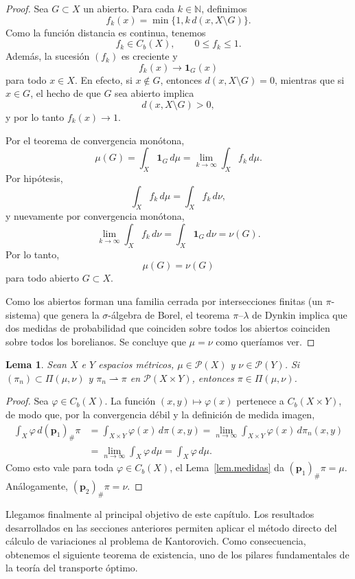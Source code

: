 \documentclass[12pt, a4paper]{amsbook}
\newcommand{\pp}{{\mathbf p}}
\newtheorem{lema}[teo]{Lema}
\theoremstyle{remark}
\theoremstyle{definition}
\numberwithin{section}{chapter}
\numberwithin{subsection}{section}
\numberwithin{equation}{section}
\numberwithin{figure}{chapter}
\begin{document}
\begin{proof}
Sea $G\subset X$ un abierto. Para cada $k\in\mathbb N$, definimos
\[
f_k(x)
=
\min\bigl\{1,k\,d(x,X\setminus G)\bigr\}.
\]
Como la función distancia es continua, tenemos
\[
f_k\in C_b(X),
\qquad
0\leq f_k\leq1.
\]
Además, la sucesión $(f_k)$ es creciente y
\[
f_k(x)\longrightarrow\mathbf 1_G(x)
\]
para todo $x\in X$. En efecto, si $x\notin G$, entonces
$d(x,X\setminus G)=0$, mientras que si $x\in G$, el hecho de que $G$ sea
abierto implica
\[
d(x,X\setminus G)>0,
\]
y por lo tanto $f_k(x)\to1$.

Por el teorema de convergencia monótona,
\[
\mu(G)
=
\int_X\mathbf 1_G\,d\mu
=
\lim_{k\to\infty}\int_X f_k\,d\mu.
\]
Por hipótesis,
\[
\int_X f_k\,d\mu
=
\int_X f_k\,d\nu,
\]
y nuevamente por convergencia monótona,
\[
\lim_{k\to\infty}\int_X f_k\,d\nu
=
\int_X\mathbf 1_G\,d\nu
=
\nu(G).
\]
Por lo tanto,
\[
\mu(G)=\nu(G)
\]
para todo abierto $G\subset X$.

Como los abiertos forman una familia cerrada por intersecciones finitas
(un $\pi$-sistema) que genera la $\sigma$-álgebra de Borel, el teorema
$\pi$--$\lambda$ de Dynkin implica que dos medidas de probabilidad que
coinciden sobre todos los abiertos coinciden sobre todos los borelianos. Se
concluye que
\(
\mu=\nu
\)
como queríamos ver.
\end{proof}

\begin{lema}\label{lema.Pi.cerrado}
Sean $X$ e $Y$ espacios métricos, $\mu\in\mathcal P(X)$ y $\nu\in\mathcal P(Y)$.
Si $(\pi_n)\subset\Pi(\mu,\nu)$ y $\pi_n\rightharpoonup\pi$ en
$\mathcal P(X\times Y)$, entonces $\pi\in\Pi(\mu,\nu)$.
\end{lema}

\begin{proof}
Sea $\varphi\in C_b(X)$. La función $(x,y)\mapsto\varphi(x)$ pertenece a
$C_b(X\times Y)$, de modo que, por la convergencia débil y la definición de
medida imagen,
\[
\begin{aligned}
\int_X\varphi\,d(\pp_1)_\#\pi
&=\int_{X\times Y}\varphi(x)\,d\pi(x,y)
=\lim_{n\to\infty}\int_{X\times Y}\varphi(x)\,d\pi_n(x,y)\\
&=\lim_{n\to\infty}\int_X\varphi\,d\mu
=\int_X\varphi\,d\mu.
\end{aligned}
\]
Como esto vale para toda $\varphi\in C_b(X)$, el Lema~\ref{lem.medidas} da
$(\pp_1)_\#\pi=\mu$. Análogamente, $(\pp_2)_\#\pi=\nu$.
\end{proof}

Llegamos finalmente al principal objetivo de este capítulo. Los resultados desarrollados en las secciones anteriores permiten aplicar el método directo del cálculo de variaciones al problema de Kantorovich. Como consecuencia, obtenemos el siguiente teorema de existencia, uno de los pilares fundamentales de la teoría del transporte óptimo.
\end{document}
